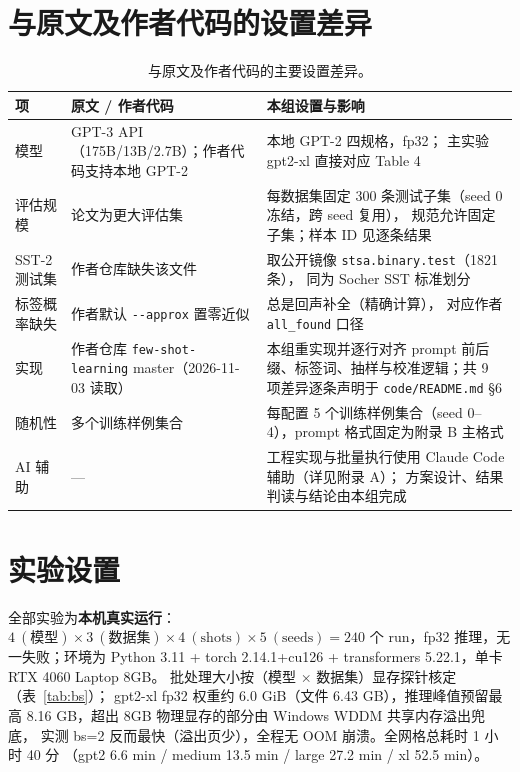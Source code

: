 \documentclass[11pt,a4paper]{ctexart}
\begin{document}
\section{与原文及作者代码的设置差异}

\begin{table}[h]\centering\small
\begin{tabular}{p{3.1cm}p{4.6cm}p{6.6cm}}
\toprule
\textbf{项} & \textbf{原文 / 作者代码} & \textbf{本组设置与影响} \\
\midrule
模型 & GPT-3 API（175B/13B/2.7B）；作者代码支持本地 GPT-2 & 本地 GPT-2 四规格，fp32；
主实验 gpt2-xl 直接对应 Table 4 \\
评估规模 & 论文为更大评估集 & 每数据集固定 300 条测试子集（seed 0 冻结，跨 seed 复用），
规范允许固定子集；样本 ID 见逐条结果 \\
SST-2 测试集 & 作者仓库缺失该文件 & 取公开镜像 \texttt{stsa.binary.test}（1821 条），
同为 Socher SST 标准划分 \\
标签概率缺失 & 作者默认 \texttt{-{}-approx} 置零近似 & 总是回声补全（精确计算），
对应作者 \texttt{all\_found} 口径 \\
实现 & 作者仓库 \texttt{few-shot-learning} master（2026-11-03 读取） &
本组重实现并逐行对齐 prompt 前后缀、标签词、抽样与校准逻辑；共 9 项差异逐条声明于
\texttt{code/README.md} \S6 \\
随机性 & 多个训练样例集合 & 每配置 5 个训练样例集合（seed 0--4），prompt 格式固定为附录 B 主格式 \\
AI 辅助 & --- & 工程实现与批量执行使用 Claude Code 辅助（详见附录 A）；
方案设计、结果判读与结论由本组完成 \\
\bottomrule
\end{tabular}
\caption{与原文及作者代码的主要设置差异。}
\end{table}

\section{实验设置}

全部实验为\textbf{本机真实运行}：$4\ (\text{模型}) \times 3\ (\text{数据集}) \times 4\ (\text{shots})
\times 5\ (\text{seeds}) = 240$ 个 run，fp32 推理，无一失败；环境为 Python 3.11 +
torch 2.14.1+cu126 + transformers 5.22.1，单卡 RTX 4060 Laptop 8GB。
批处理大小按（模型 $\times$ 数据集）显存探针核定（表~\ref{tab:bs}）；
gpt2-xl fp32 权重约 6.0 GiB（文件 6.43 GB），推理峰值预留最高 8.16 GB，超出
8GB 物理显存的部分由 Windows WDDM 共享内存溢出兜底，
实测 bs=2 反而最快（溢出页少），全程无 OOM 崩溃。全网格总耗时 1 小时 40 分
（gpt2 6.6 min / medium 13.5 min / large 27.2 min / xl 52.5 min）。
\end{document}
